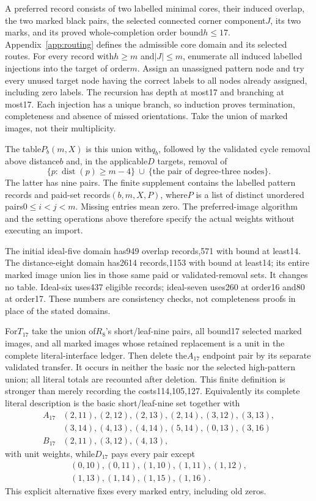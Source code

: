 \documentclass[11pt]{article}
\theoremstyle{remark}\newtheorem{remark}[theorem]{Remark}
\begin{document}
A preferred record consists of two labelled minimal cores, their
induced overlap, the two marked black pairs, the selected connected
corner component$J$, its two marks, and its proved whole-completion
order bound$h\le17$. Appendix~\ref{app:routing} defines the admissible
core domain and its selected routes. For every record with$h\ge m$
and$|J|\le m$, enumerate all induced labelled injections into the
target of order$m$. Assign an unassigned pattern node and try every
unused target node having the correct labels to all nodes already
assigned, including zero labels. The recursion has depth at most17
and branching at most17. Each injection has a unique branch, so
induction proves termination, completeness and absence of missed
orientations. Take the union of marked images, not their multiplicity.

The table$P_b(m,X)$ is this union with$q_b$, followed by the
validated cycle removal above distance$b$ and, in the applicable$D$
targets, removal of
\[
 \{p:\operatorname{dist}(p)\ge m-4\}
   \ \cup\ \{\text{the pair of degree-three nodes}\}.
\]
The latter has nine pairs. The finite supplement contains the labelled
pattern records and paid-set records$(b,m,X,P)$, where$P$ is a list
of distinct unordered pairs$0\le i<j<m$. Missing entries mean zero.
The preferred-image algorithm and the setting operations above
therefore specify the actual weights without executing an import.

The initial ideal-five domain has949 overlap records,571 with bound
at least14. The distance-eight domain has2614 records,1153 with
bound at least14; its entire marked image union lies in those same
paid or validated-removal sets. It changes no table. Ideal-six
uses437 eligible records; ideal-seven uses260 at order16 and80
at order17. These numbers are consistency checks, not completeness
proofs in place of the stated domains.

For$T_{17}$ take the union of$R_8$'s short/leaf-nine pairs, all
bound17 selected marked images, and all marked images whose retained
replacement is a unit in the complete literal-interface ledger.
Then delete the$A_{17}$ endpoint pair by its separate validated
transfer. It occurs in neither the basic nor the selected high-pattern
union; all literal totals are recounted after deletion. This finite
definition is stronger than merely recording the costs114,105,127.
Equivalently its complete literal description is the basic short/leaf-nine
set together with
\[
\begin{array}{c|l}
A_{17}&(2,11),(2,12),(2,13),(2,14),(3,12),(3,13),\\
 &(3,14),(4,13),(4,14),(5,14),(0,13),(3,16)\\
B_{17}&(2,11),(3,12),(4,13),
\end{array}
\]
with unit weights, while$D_{17}$ pays every pair except
\[
\begin{gathered}
(0,10),(0,11),(1,10),(1,11),(1,12),\\
(1,13),(1,14),(1,15),(1,16).
\end{gathered}
\]
This explicit alternative fixes every marked entry, including old zeros.
\end{document}
